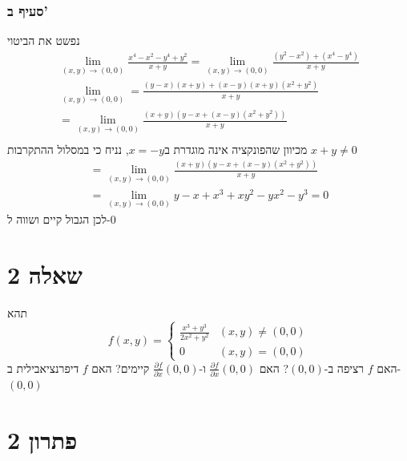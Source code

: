 \documentclass[12pt, titlepage]{article}
\begin{document}
\section*{סעיף ב'}
נפשט את הביטוי
\begin{gather*}
    \lim_{\left(x,y\right)\to\left(0,0\right)} \frac{x^4-x^2-y^4+y^2}{x+y} =\lim_{\left(x,y\right)\to\left(0,0\right)} \frac{\left(y^2-x^2\right)+\left(x^4-y^4\right)}{x+y}\\
    \lim_{\left(x,y\right)\to\left(0,0\right)} = \frac{\left(y-x\right)\left(x+y\right) +\left(x-y\right)\left(x+y\right)\left(x^2+y^2\right)}{x+y} \\
    = \lim_{\left(x,y\right)\to\left(0,0\right)} \frac{\left(x+y\right)\left(y-x+\left(x-y\right)\left(x^2+y^2\right)\right)}{x+y} \\
\end{gather*}
מכיוון שהפונקציה אינה מוגדרת ב$x=-y$, נניח כי במסלול ההתקרבות $x+y\neq 0$
\begin{gather*}
    = \lim_{\left(x,y\right)\to\left(0,0\right)} \frac{\left(x+y\right)\left(y-x+\left(x-y\right)\left(x^2+y^2\right)\right)}{x+y} \\
    = \lim_{\left(x,y\right) \to \left(0,0\right)} y-x+x^3+xy^2-yx^2-y^3 = \boxed{0}
\end{gather*}
לכן הגבול קיים ושווה ל-$0$
\newpage
\part*{שאלה 2}
תהא
\[
    f\left(x,y\right) = \begin{cases}
        \frac{x^3+y^3}{2x^2+y^2} & \left(x,y\right) \neq(0,0)\\
        0 & \left(x,y\right) = \left(0,0\right)
    \end{cases}
\]
האם $f$ רציפה ב-$\left(0,0\right)$? האם $\frac{\partial f}{\partial x} \left(0,0\right)$ ו-$\frac{\partial f}{\partial x} \left(0,0\right)$ קיימים? האם $f$ דיפרנציאבילית ב-$\left(0,0\right)$
\part*{פתרון 2}
\end{document}
